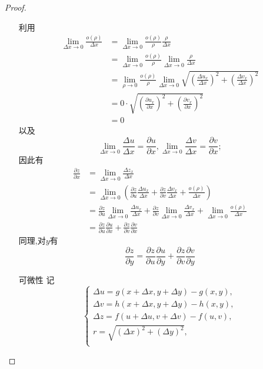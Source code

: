 \begin{proof}
\begin{enumerate}
        利用
        \begin{align*}
            \lim_{\Delta x\to 0}\frac{o(\rho)}{\Delta x}
            &=\lim_{\Delta x\to 0}\frac{o(\rho)}{\rho}\frac{\rho}{\Delta x}\\
            &=\lim_{\Delta x\to 0}\frac{o(\rho)}{\rho}\lim_{\Delta x\to 0}\frac{\rho}{\Delta x}\\
            &=\lim_{\rho\to 0}\frac{o(\rho)}{\rho}\lim_{\Delta x\to 0}\sqrt{\left(\frac{\Delta u_x}{\Delta x}\right)^2+\left(\frac{\Delta v_x}{\Delta x}\right)^2}\\
            &=0\cdot\sqrt{\left(\frac{\partial u_x}{\partial x}\right)^2+\left(\frac{\partial v_x}{\partial x}\right)^2}\\&=0
        \end{align*}
        以及
            $$
            \lim_{\Delta x\to 0}\frac{\Delta u}{\Delta x}=\frac{\partial u}{\partial x},
            \lim_{\Delta x\to 0}\frac{\Delta v}{\Delta x}=\frac{\partial v}{\partial x};
            $$
        因此有
        \begin{align*}
            \frac{\partial z}{\partial x}
            &=\lim_{\Delta x\to 0}\frac{\Delta z_x}{\Delta x}\\
            &=\lim_{\Delta x\to 0}\left(\frac{\partial z}{\partial u}\frac{\Delta u_x}{\Delta x}+\frac{\partial z}{\partial v}\frac{\Delta v_x}{\Delta x}+ \frac{o(\rho)}{\Delta x}\right)\\
            &=\frac{\partial z}{\partial u}\lim_{\Delta x\to 0}\frac{\Delta u_x}{\Delta x}+\frac{\partial z}{\partial v}\lim_{\Delta x\to 0}\frac{\Delta v_x}{\Delta x}+ \lim_{\Delta x\to 0}\frac{o(\rho)}{\Delta x}\\
            &=\frac{\partial z}{\partial u}\frac{\partial u}{\partial x}+\frac{\partial z}{\partial v}\frac{\partial v}{\partial x}
        \end{align*}
        同理,对$y$有$$\frac{\partial z}{\partial y}=\frac{\partial z}{\partial u}\frac{\partial u}{\partial y}+\frac{\partial z}{\partial v}\frac{\partial v}{\partial y}$$
        \item[可微性] 
            记$$\begin{cases}
                \Delta u = g(x+\Delta x,y+\Delta y)-g(x,y),\\
                \Delta v = h(x+\Delta x,y+\Delta y)-h(x,y),\\
                \Delta z = f(u+\Delta u,v+\Delta v)-f(u,v),\\
                r = \sqrt{(\Delta x)^2+(\Delta y)^2},\\

\end{cases}$$
\end{enumerate}
\end{proof}
